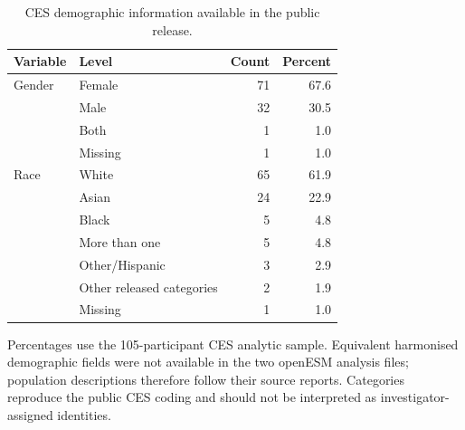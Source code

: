 \documentclass[pdflatex,sn-vancouver-num]{sn-jnl}
\begin{document}
\begin{table}[!htbp]
\caption{CES demographic information available in the public release.}\label{tab:s12}
\centering\small
\begin{tabular}{@{}llrr@{}}
\toprule
Variable & Level & Count & Percent\\
\midrule
Gender & Female & 71 & 67.6\\
 & Male & 32 & 30.5\\
 & Both & 1 & 1.0\\
 & Missing & 1 & 1.0\\
Race & White & 65 & 61.9\\
 & Asian & 24 & 22.9\\
 & Black & 5 & 4.8\\
 & More than one & 5 & 4.8\\
 & Other/Hispanic & 3 & 2.9\\
 & Other released categories & 2 & 1.9\\
 & Missing & 1 & 1.0\\
\bottomrule
\end{tabular}
\begin{flushleft}\footnotesize Percentages use the 105-participant CES analytic sample. Equivalent harmonised demographic fields were not available in the two openESM analysis files; population descriptions therefore follow their source reports. Categories reproduce the public CES coding and should not be interpreted as investigator-assigned identities.\end{flushleft}
\end{table}
\end{document}
